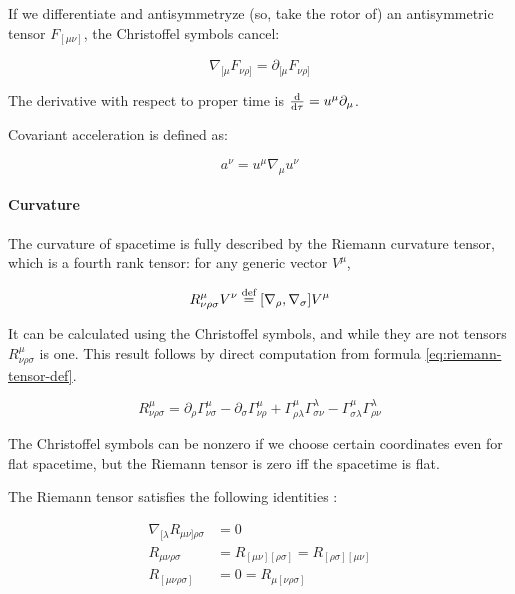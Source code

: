 \documentclass[main.tex]{subfiles}
\begin{document}
If we differentiate and antisymmetryze (so, take the rotor of) an antisymmetric tensor $F_{[\mu \nu]}$, the Christoffel symbols cancel:

\begin{equation}
    \nabla_{[\mu} F_{\nu\rho]} = \partial_{[\mu} F_{\nu\rho]}
\end{equation}

The derivative with respect to proper time is $\dv{}{\tau} = u^\mu \partial_\mu$.

Covariant acceleration is defined as:

\begin{equation} \label{eq:covariant-acceleration-def}
    a^\nu = u^\mu \nabla_\mu u^\nu
\end{equation}

\paragraph{Curvature}

The curvature of spacetime is fully described by the Riemann curvature tensor, which is a fourth rank tensor: for any generic vector \(V^\mu\),

\begin{equation} \label{eq:riemann-tensor-def}
    R ^{\mu} _{\nu \rho \sigma} V^\nu \stackrel{\text{def}}{=} [\nabla_\rho, \nabla_\sigma]   V^\mu
\end{equation}

It can be calculated using the Christoffel symbols, and while they are not tensors \(R ^{\mu} _{\nu \rho \sigma}\) is one. This result follows by direct computation from formula \eqref{eq:riemann-tensor-def}.

\begin{equation}
    R ^{\mu} _{\nu \rho \sigma} =
     \partial_\rho \Gamma^\mu_{\nu \sigma}
    -\partial_\sigma \Gamma^\mu_{\nu \rho}
    +\Gamma^\mu_{\rho \lambda} \Gamma ^{\lambda} _{\sigma \nu}
    -\Gamma^\mu_{\sigma \lambda} \Gamma ^{\lambda} _{\rho \nu}
\end{equation}

The Christoffel symbols can be nonzero if we choose certain coordinates even for flat spacetime, but the Riemann tensor is zero iff the spacetime is flat.

The Riemann tensor satisfies the following identities \cite[eqs. 8.45 and 8.76]{Misner:1973}:

\begin{subequations}
\begin{align}
  \nabla _{[\lambda} R_{\mu\nu]\rho \sigma} &= 0 \label{eq:bianchi-identities}  \\
  R_{\mu\nu\rho\sigma} &= R_{[\mu\nu][\rho\sigma]} = R_{[\rho\sigma][\mu\nu]}  \\
  R_{[\mu\nu\rho\sigma]} &= 0 = R_{\mu[\nu\rho\sigma]}
\end{align}
\end{subequations}
\end{document}
